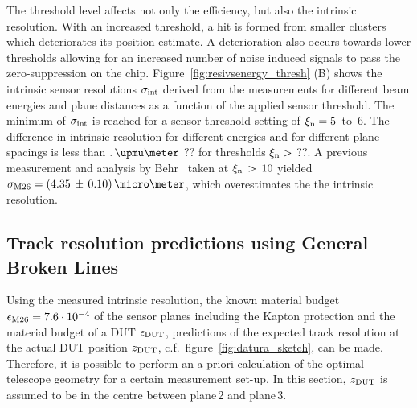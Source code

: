 The threshold level affects not only the efficiency, but also the intrinsic resolution. 
With an increased threshold, a hit is formed from smaller clusters which deteriorates its position estimate. 
A deterioration also occurs towards lower thresholds allowing for an increased number of noise induced signals to pass the zero-suppression on the chip.
Figure~\ref{fig:resivsenergy_thresh} (B) shows the intrinsic sensor resolutions $\sigma_{\textrm{int}}$ derived from the measurements for different beam energies and plane distances as a function of the applied sensor threshold.
The minimum of $\sigma_{\textrm{int}}$ is reached for a sensor threshold setting of $\xi_{\textrm{n}} = 5$~to~6.
The difference in intrinsic resolution for different energies and for different plane spacings is less than $.\,\upmu\meter$ ?? for thresholds $\xi_{\textrm{n}} > $ ??. 
A previous measurement and analysis by Behr~\cite{ref:j.behrmeasurements} taken at $\xi_{\textrm{n}}\,>\,10$ yielded $\sigma_{\textrm{M26}} = (4.35\,\pm\,0.10)\,\micro\meter$, which overestimates the the intrinsic resolution. 



\subsection{Track resolution predictions using General Broken Lines}

% 
Using the measured intrinsic resolution, the known material budget $\mathnormal{\epsilon_{\textrm{M26}}} = 7.6\cdot 10^{-4}$ of the sensor planes including the Kapton protection and the material budget of a DUT $\mathnormal{\epsilon_{\textrm{DUT}}}$,
 predictions of the expected track resolution at the actual DUT position $z_{\textrm{DUT}}$, c.f.\ figure~\ref{fig:datura_sketch}, can be made.
Therefore, it is possible to perform an a priori calculation of the optimal telescope geometry for a certain measurement set-up. 
In this section, $z_{\textrm{DUT}}$ is assumed to be in the centre between plane\,2 and plane\,3.

